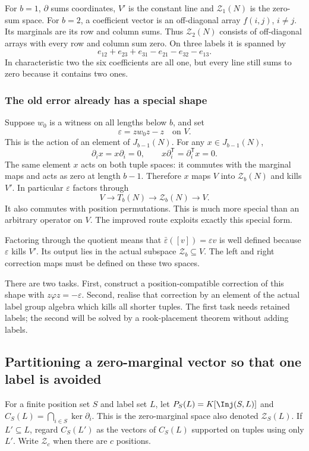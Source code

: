 \begin{example}
For $b=1$, $\partial$ sums coordinates, $V'$ is the constant line and $\mathcal Z_1(N)$ is the zero-sum space. For $b=2$, a coefficient vector is an off-diagonal array $f(i,j)$, $i\ne j$. Its marginals are its row and column sums. Thus $\mathcal Z_2(N)$ consists of off-diagonal arrays with every row and column sum zero. On three labels it is spanned by
\[e_{12}+e_{23}+e_{31}-e_{21}-e_{32}-e_{13}.
\]
In characteristic two the six coefficients are all one, but every line still sums to zero because it contains two ones.
\end{example}

\subsubsection{The old error already has a special shape}
Suppose $w_0$ is a witness on all lengths below $b$, and set
\[\varepsilon=zw_0z-z\quad\text{on }V.\]
This is the action of an element of $J_{b-1}(N)$. For any $x\in J_{b-1}(N)$,
\[\partial_i x=x\partial_i=0,\qquad x\partial_i^{\mathsf T}=\partial_i^{\mathsf T}x=0.
\]
The same element $x$ acts on both tuple spaces: it commutes with the
marginal maps and acts as zero at length $b-1$.
Therefore $x$ maps $V$ into $\mathcal Z_b(N)$ and kills $V'$. In particular $\varepsilon$ factors through
\[V\longrightarrow T_b(N)\longrightarrow \mathcal Z_b(N)\longrightarrow V.
\]
It also commutes with position permutations. This is much more special than an arbitrary operator on $V$. The improved route exploits exactly this special form.

Factoring through the quotient means that
$\bar\varepsilon([v])=\varepsilon v$ is well defined because
$\varepsilon$ kills $V'$. Its output lies in the actual subspace
$\mathcal Z_b\subseteq V$. The left and right correction maps must
be defined on these two spaces.

There are two tasks. First, construct a position-compatible correction of this shape with $z\varphi z=-\varepsilon$. Second, realise that correction by an element of the actual label group algebra which kills all shorter tuples. The first task needs retained labels; the second will be solved by a rook-placement theorem without adding labels.

\subsection{Partitioning a zero-marginal vector so that one label is avoided}\label{sec:partition}
For a finite position set $S$ and label set $L$, let $P_S(L)=K[\Inj(S,L)]$ and $C_S(L)=\bigcap_{i\in S}\ker\partial_i$. This is the zero-marginal space also denoted $\mathcal Z_S(L)$. If $L'\subseteq L$, regard $C_S(L')$ as the vectors of $C_S(L)$ supported on tuples using only $L'$. Write $\mathcal Z_c$ when there are $c$ positions.

